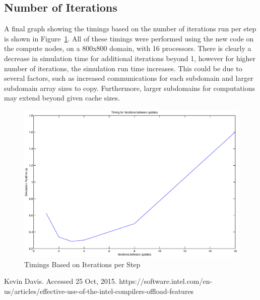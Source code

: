 \documentclass{article}
\begin{document}
\subsection{Number of Iterations}
A final graph showing the timings based on the number of iterations run per step is shown in Figure~\ref{fig:niter}. All of these timings were performed using the new code on the compute nodes, on a 800x800 domain, with 16 processors. There is clearly a decrease in simulation time for additional iterations beyond 1, however for higher number of iterations, the simulation run time increases. This could be due to several factors, such as increased communications for each subdomain and larger subdomain array sizes to copy. Furthermore, larger subdomains for computations may extend beyond given cache sizes. 

\begin{figure}[here]
 \centering
 \includegraphics[width=0.9\linewidth]{t_iter.eps}
 \caption{Timings Based on Iterations per Step}
 \label{fig:niter}
\end{figure}



\begin{thebibliography}{1}
Kevin Davis. Accessed 25 Oct, 2015. https://software.intel.com/en-us/articles/effective-use-of-the-intel-compilers-offload-features

\end{thebibliography}
\end{document}
